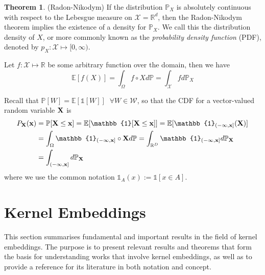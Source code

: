 \documentclass[twoside]{article} \usepackage{aistats2017}
\theoremstyle{definition}
\newtheorem{theorem}{Theorem}[section]
\newcommand{\rv}[1]{{#1}}
\begin{document}
	\begin{theorem} \label{thm:radon_nikodym}
		(Radon-Nikodym)
		If the distribution $\mathbb{P}_{\rv{X}}$ is absolutely continuous with respect to the Lebesgue measure on $\mathcal{X} = \mathbb{R}^{d}$, then the Radon-Nikodym theorem implies the existence of a density for $\mathbb{P}_{\rv{X}}$. We call this the distribution density of $\rv{X}$, or more commonly known as the \textit{probability density function} (PDF), denoted by $p_{\rv{X}}: \mathcal{X} \mapsto [0, \infty)$.
	\end{theorem}
	
	Let $f : \mathcal{X} \mapsto \mathbb{R}$ be some arbitrary function over the domain, then we have
	\begin{equation}
	\mathbb{E}[f(\rv{X})] = \int_{\Omega} f \circ \rv{X} d \mathbb{P} = \int_{\mathcal{X}} f d \mathbb{P}_{\rv{X}}
	\label{eq:functional_expectation}
	\end{equation}
	
	Recall that $\mathbb{P}[W] = \mathbb{E}[\mathbb{1}[W]] \;\; \forall W \in \mathcal{W}$, so that the CDF for a vector-valued random variable $\bvec{\rv{X}}$ is
	\begin{equation}
	\begin{aligned}
	P_{\bvec{\rv{X}}}(\bvec{x}) &= \mathbb{P}[\bvec{\rv{X}} \leq \bvec{x}] = \mathbb{E}[\mathbb{1}[\bvec{\rv{X}} \leq \bvec{x}]] = \mathbb{E}[\mathbb{1}_{(-\bvec{\infty}, \bvec{x}]}(\bvec{X})] \\
	&= \int_{\Omega} \mathbb{1}_{(-\bvec{\infty}, \bvec{x}]} \circ \bvec{\rv{X}} d \mathbb{P} = \int_{\mathbb{R}^{D}} \mathbb{1}_{(-\bvec{\infty}, \bvec{x}]} d \mathbb{P}_{\bvec{\rv{X}}} \\
	&= \int_{(-\bvec{\infty}, \bvec{x}]} d \mathbb{P}_{\bvec{\rv{X}}}
	\end{aligned}
	\label{eq:cdf_integral}
	\end{equation}
	where we use the common notation $\mathbb{1}_{A}(x) := \mathbb{1}[x \in A]$.
		
\section{Kernel Embeddings}
\label{sec:kernel_embeddings}
	
	This section summarises fundamental and important results in the field of kernel embeddings. The purpose is to present relevant results and theorems that form the basis for understanding works that involve kernel embeddings, as well as to provide a reference for its literature in both notation and concept. 
	
\end{document}
